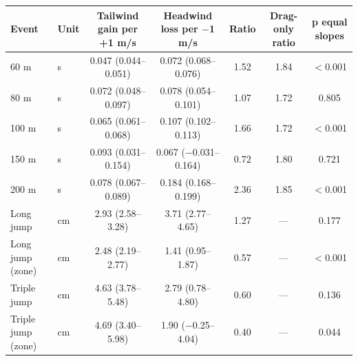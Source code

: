 \begin{tabular}{llccccc}
\toprule
Event & Unit & Tailwind gain per +1 m/s & Headwind loss per $-$1 m/s & Ratio & Drag-only ratio & p equal slopes \\
\midrule
60 m & s & 0.047 (0.044--0.051) & 0.072 (0.068--0.076) & 1.52 & 1.84 & $<$0.001 \\
80 m & s & 0.072 (0.048--0.097) & 0.078 (0.054--0.101) & 1.07 & 1.72 & 0.805 \\
100 m & s & 0.065 (0.061--0.068) & 0.107 (0.102--0.113) & 1.66 & 1.72 & $<$0.001 \\
150 m & s & 0.093 (0.031--0.154) & 0.067 ($-$0.031--0.164) & 0.72 & 1.80 & 0.721 \\
200 m & s & 0.078 (0.067--0.089) & 0.184 (0.168--0.199) & 2.36 & 1.85 & $<$0.001 \\
Long jump & cm & 2.93 (2.58--3.28) & 3.71 (2.77--4.65) & 1.27 & --- & 0.177 \\
Long jump (zone) & cm & 2.48 (2.19--2.77) & 1.41 (0.95--1.87) & 0.57 & --- & $<$0.001 \\
Triple jump & cm & 4.63 (3.78--5.48) & 2.79 (0.78--4.80) & 0.60 & --- & 0.136 \\
Triple jump (zone) & cm & 4.69 (3.40--5.98) & 1.90 ($-$0.25--4.04) & 0.40 & --- & 0.044 \\
\bottomrule
\end{tabular}
